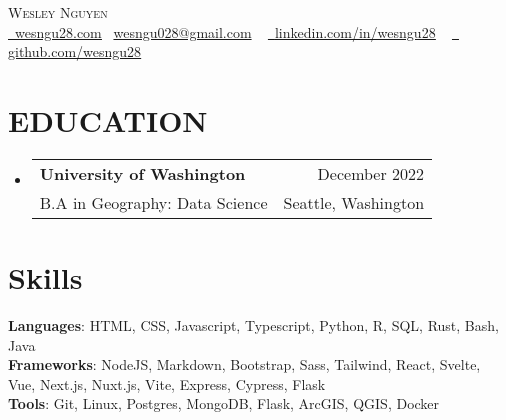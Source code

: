 \documentclass[letterpaper,11pt]{article}
\makeatletter
\newcommand{\resumeSubheading}[4]{
  \vspace{-2pt}\item
    \begin{tabular*}{0.97\textwidth}[t]{l@{\extracolsep{\fill}}r}
      \textbf{#1} & #2 \\
      {\small#3} & {\small #4} \\
    \end{tabular*}\vspace{-7pt}
}
\newcommand{\resumeSubHeadingListStart}{\begin{itemize}[leftmargin=0.15in, label={}]}
\newcommand{\resumeSubHeadingListEnd}{\end{itemize}}
\makeatother
\begin{document}

\begin{center}
    {\Huge \scshape Wesley Nguyen} \\ \vspace{4pt}\href{https://wesngu28.com}{\raisebox{-0.2\height}\ \underline{wesngu28.com}} {\raisebox{-0.2\height}\  \underline{wesngu028@gmail.com}} ~
    \href{https://linkedin.com/in/wesngu28/}{\raisebox{-0.2\height}\ \underline{linkedin.com/in/wesngu28}}  ~
    \href{https://github.com/wesngu28}{\raisebox{-0.2\height}\ \underline{ github.com/wesngu28}}
    \vspace{-8pt}
\end{center}


\section{EDUCATION}
  \resumeSubHeadingListStart
    \resumeSubheading
      {University of Washington}{December 2022}
      {B.A in Geography: Data Science}{Seattle, Washington}
  \resumeSubHeadingListEnd

\section{Skills}
 \begin{itemize}[leftmargin=0.15in, label={}]
    \small{\item{
     \textbf{Languages}{: HTML, CSS, Javascript, Typescript, Python, R, SQL, Rust, Bash, Java} \\
     \vspace{3pt}
     \textbf{Frameworks}{: NodeJS, Markdown, Bootstrap, Sass, Tailwind, React, Svelte, Vue, Next.js, Nuxt.js, Vite, Express, Cypress, Flask} \\
     \vspace{3pt}
     \textbf{Tools}{: Git, Linux, Postgres, MongoDB, Flask, ArcGIS, QGIS, Docker} \\
    }}
 \end{itemize}
\end{document}
